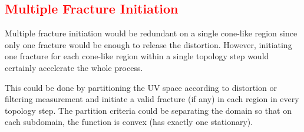 \textcolor{red}{
\subsection{Multiple Fracture Initiation}
}
Multiple fracture initiation would be redundant on a single cone-like region since only one fracture would be enough to release the distortion. However, initiating one fracture for each cone-like region within a single topology step would certainly accelerate the whole process. 

This could be done by partitioning the UV space according to distortion or filtering measurement and initiate a valid fracture (if any) in each region in every topology step. The partition criteria could be separating the domain so that on each subdomain, the function is convex (has exactly one stationary).
